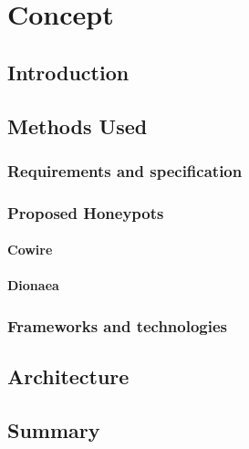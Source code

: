 \chapter{Concept}


\section{Introduction}

\section{Methods Used}

\subsection{Requirements and specification}

\subsection{Proposed Honeypots}

\subsubsection{Cowire}

\subsubsection{Dionaea}




\subsection{Frameworks and technologies}


\section{Architecture}




\section{Summary}